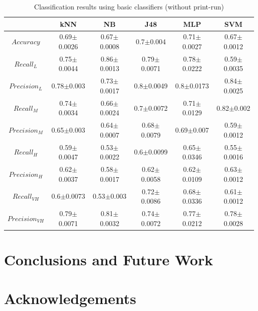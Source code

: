 \documentclass{llncs}
\begin{document}
\begin{table}
\caption{Classification results using basic classifiers (without print-run)}
\centering{}%
\begin{tabular}{|c|c|c|c|c|c|}
\hline 
 & kNN  & NB  & J48  & MLP  & SVM\tabularnewline
\hline 
\hline 
$Accuracy$  & 0.69$\pm$0.0026 & 0.67$\pm$0.0008 & 0.7$\pm$0.004 & 0.71$\pm$0.0027 & 0.67$\pm$0.0012\tabularnewline
\hline 
\hline 
$Recall_{L}$  & 0.75$\pm$0.0044 & 0.86$\pm$0.0013 & 0.79$\pm$0.0071 & 0.78$\pm$0.0222 & 0.59$\pm$0.0035\tabularnewline
\hline 
$Precision_{L}$  & 0.78$\pm$0.003 & 0.73$\pm$0.0017 & 0.8$\pm$0.0049 & 0.8$\pm$0.0173 & 0.84$\pm$0.0025\tabularnewline
\hline 
\hline 
$Recall_{M}$  & 0.74$\pm$0.0034 & 0.66$\pm$0.0024 & 0.7$\pm$0.0072 & 0.71$\pm$0.0129 & 0.82$\pm$0.002\tabularnewline
\hline 
$Precision_{M}$  & 0.65$\pm$0.003 & 0.64$\pm$0.0007 & 0.68$\pm$0.0079 & 0.69$\pm$0.007 & 0.59$\pm$0.0012\tabularnewline
\hline 
\hline 
$Recall_{H}$  & 0.59$\pm$0.0047 & 0.53$\pm$0.0022 & 0.6$\pm$0.0099 & 0.65$\pm$0.0346 & 0.55$\pm$0.0016\tabularnewline
\hline 
$Precision_{H}$  & 0.62$\pm$0.0037 & 0.58$\pm$0.0017 & 0.62$\pm$0.0058 & 0.62$\pm$0.0109 & 0.63$\pm$0.0012\tabularnewline
\hline 
\hline 
$Recall_{VH}$  & 0.6$\pm$0.0073 & 0.53$\pm$0.003 & 0.72$\pm$0.0086 & 0.68$\pm$0.0336 & 0.61$\pm$0.0012\tabularnewline
\hline 
$Precision_{VH}$  & 0.79$\pm$0.0071 & 0.81$\pm$0.0032 & 0.74$\pm$0.0072 & 0.77$\pm$0.0212 & 0.78$\pm$0.0028\tabularnewline
\hline 
\end{tabular}
\end{table}

\section{Conclusions and Future Work}
\label{sec:conclusionsAndFutureWork}





\section*{Acknowledgements}






\end{document}
